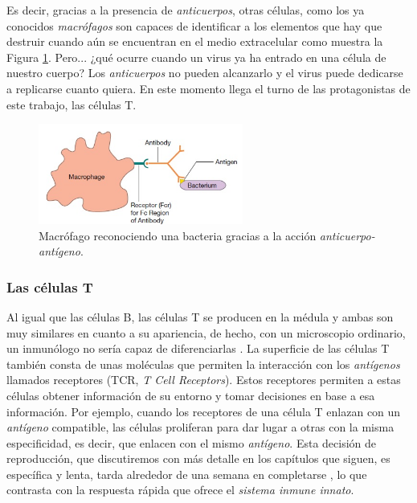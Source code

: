 Es decir, gracias a la presencia de \textit{anticuerpos}, otras células, como los ya conocidos \textit{macrófagos} son capaces de identificar a los elementos que hay que destruir cuando aún se encuentran en el medio extracelular como muestra la Figura \ref{fig:macrofago_anticuerpo}. Pero... ¿qué ocurre cuando un virus ya ha entrado en una célula de nuestro cuerpo? Los \textit{anticuerpos} no pueden alcanzarlo y el virus puede dedicarse a replicarse cuanto quiera. En este momento llega el turno de las protagonistas de este trabajo, las células T. 



\begin{figure}[t]
	\centering
	\includegraphics[width=0.6\textwidth]{2_macrofago_anticuerpo}
	\caption{Macrófago reconociendo una bacteria gracias a la acción \textit{anticuerpo-antígeno}.}
	\label{fig:macrofago_anticuerpo}
\end{figure}


\subsubsection{Las células T}
\label{Tcell}

Al igual que las células B, las células T se producen en la médula y ambas son muy similares en  cuanto a su apariencia, de hecho, con un microscopio ordinario, un inmunólogo no sería capaz de diferenciarlas \citep{theHowItWorks}. La superficie de las células T también consta de unas moléculas que permiten la interacción con los \textit{antígenos} llamados receptores (TCR, \textit{T Cell Receptors}). Estos receptores permiten a estas células obtener información de su entorno y tomar decisiones en base a esa información. Por ejemplo, cuando los receptores de una célula T enlazan con un \textit{antígeno} compatible, las células proliferan para dar lugar a otras con la misma especificidad, es decir, que enlacen con el mismo \textit{antígeno}. Esta decisión de reproducción, que discutiremos con más detalle en los capítulos que siguen, es específica y lenta, tarda alrededor de una semana en completarse \citep{theHowItWorks}, lo que contrasta con la respuesta rápida que ofrece el \textit{sistema inmune innato}.


